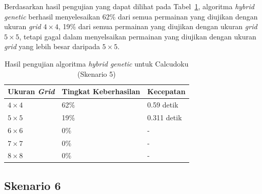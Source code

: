 Berdasarkan hasil pengujian yang dapat dilihat pada Tabel~\ref{tab:pengujianhg5}, algoritma \textit{hybrid genetic} berhasil menyelesaikan 62\% dari semua permainan yang diujikan dengan ukuran \textit{grid} \begin{math}4 \times 4\end{math}, 19\% dari semua permainan yang diujikan dengan ukuran \textit{grid} \begin{math}5 \times 5\end{math}, tetapi gagal dalam menyelsaikan permainan yang diujikan dengan ukuran \textit{grid} yang lebih besar daripada \begin{math}5 \times 5\end{math}.
\begin{table}
\centering
\captionsetup{justification=centering}
\caption[Hasil pengujian algoritma \textit{hybrid genetic} untuk Calcudoku (Skenario 5)]{Hasil pengujian algoritma \textit{hybrid genetic} untuk Calcudoku (Skenario 5)}
\begin{tabular}{| l | l | l |}
\hline
Ukuran \textit{Grid} & Tingkat Keberhasilan & Kecepatan \\
\hline \hline
\begin{math}4 \times 4\end{math} & 62\% & 0.59 detik \\
\hline
\begin{math}5 \times 5\end{math} & 19\% & 0.311 detik \\
\hline
\begin{math}6 \times 6\end{math} & 0\% & - \\
\hline
\begin{math}7 \times 7\end{math} & 0\% & - \\
\hline
\begin{math}8 \times 8\end{math} & 0\% & - \\
\hline
\end{tabular}
\label{tab:pengujianhg5}
\end{table}

\subsection{Skenario 6}
\label{sec:skenario6}

